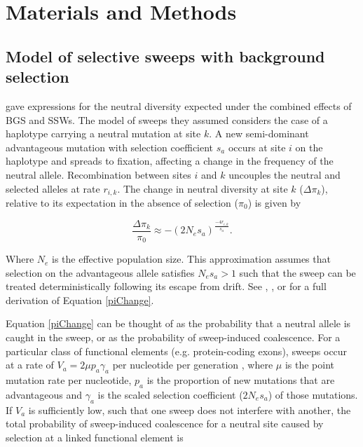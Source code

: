 %
%
\section{Materials and Methods}

\subsection{Model of selective sweeps with background selection}

	\cite{RN290} gave expressions for the neutral diversity expected under the combined effects of BGS and SSWs. The model of sweeps they assumed considers the case of a haplotype carrying a neutral mutation at site $k$. A new semi-dominant advantageous mutation with selection coefficient $s_a$ occurs at site $i$ on the haplotype and spreads to fixation, affecting a change in the frequency of the neutral allele. Recombination between sites $i$ and $k$ uncouples the neutral and selected alleles at rate $r_{i,k}$. The change in neutral diversity at site $k$ ($\Delta \pi_k$), relative to its expectation in the absence of selection ($\pi_0$) is given by
	
\begin{equation}
\label{piChange}
\frac{\Delta \pi_{k}}{\pi_{0}} \approx -(2N_e s_a)^{\frac{-4r_{i,k}}{s_a}} .
\end{equation}
	
	\noindent
Where $N_e$ is the effective population size. This approximation assumes that selection on the advantageous allele satisfies $N_es_a > 1$ such that the sweep can be treated deterministically following its escape from drift. See \cite{RN235}, \cite{RN173}, or \cite{RN290} for a full derivation of Equation \ref{piChange}. 
		
	Equation \ref{piChange} can be thought of as the probability that a neutral allele is caught in the sweep, or as the probability of sweep-induced coalescence. For a particular class of functional elements (e.g. protein-coding exons), sweeps occur at a rate of $V_{a} = 2 \mu p_{a} \gamma_{a}$  per nucleotide per generation \citep{RN384}, where $\mu$ is the point mutation rate per nucleotide, $p_a$ is the proportion of new mutations that are advantageous and $\gamma_a$ is the scaled selection coefficient ($2N_es_a$) of those mutations. If $V_a$ is sufficiently low, such that one sweep does not interfere with another, the total probability of sweep-induced coalescence for a neutral site caused by selection at a linked functional element is
	
